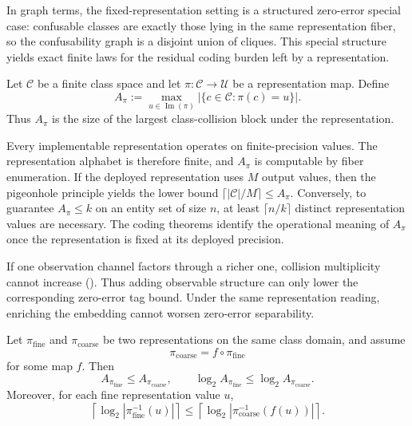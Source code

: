 In graph terms, the fixed-representation setting is a structured zero-error special case: confusable classes are exactly those lying in the same representation fiber, so the confusability graph is a disjoint union of cliques. This special structure yields exact finite laws for the residual coding burden left by a representation.

\begin{definition}\label{def:collision-multiplicity}
Let $\mathcal{C}$ be a finite class space and let $\pi : \mathcal{C} \to \mathcal U$ be a representation map. Define
\[
A_\pi := \max_{u \in \operatorname{Im}(\pi)} \left|\{c \in \mathcal{C} : \pi(c)=u\}\right|.
\]
Thus $A_\pi$ is the size of the largest class-collision block under the representation.
\end{definition}

\begin{remark}
Every implementable representation operates on finite-precision values. The representation alphabet is therefore finite, and $A_\pi$ is computable by fiber enumeration. If the deployed representation uses $M$ output values, then the pigeonhole principle yields the lower bound $\lceil |\mathcal C|/M \rceil \le A_\pi$. Conversely, to guarantee $A_\pi \le k$ on an entity set of size $n$, at least $\lceil n/k \rceil$ distinct representation values are necessary. The coding theorems identify the operational meaning of $A_\pi$ once the representation is fixed at its deployed precision.
\end{remark}

If one observation channel factors through a richer one, collision multiplicity cannot increase (). Thus adding observable structure can only lower the corresponding zero-error tag bound. Under the same representation reading, enriching the embedding cannot worsen zero-error separability.

\begin{corollary}\label{cor:concept-bottleneck-mono}
Let $\pi_{\mathrm{fine}}$ and $\pi_{\mathrm{coarse}}$ be two representations on the same class domain, and assume
\[
\pi_{\mathrm{coarse}} = f \circ \pi_{\mathrm{fine}}
\]
for some map $f$. Then
\[
A_{\pi_{\mathrm{fine}}} \le A_{\pi_{\mathrm{coarse}}},
\qquad
\log_2 A_{\pi_{\mathrm{fine}}} \le \log_2 A_{\pi_{\mathrm{coarse}}}.
\]
Moreover, for each fine representation value $u$,
\[
\left\lceil \log_2 \left|\pi_{\mathrm{fine}}^{-1}(u)\right| \right\rceil
\le
\left\lceil \log_2 \left|\pi_{\mathrm{coarse}}^{-1}(f(u))\right| \right\rceil.
\]
\end{corollary}

